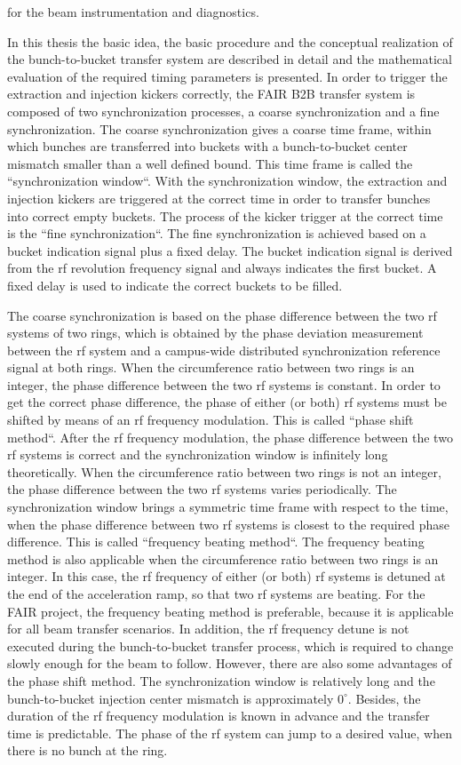for the beam instrumentation and diagnostics. 

In this thesis the basic idea, the basic procedure and the conceptual realization of the bunch-to-bucket transfer system are described in detail and the mathematical evaluation of the required timing parameters is presented. In order to trigger the extraction and injection kickers correctly, the FAIR B2B transfer system is composed of two synchronization processes, a coarse synchronization and a fine synchronization. The coarse synchronization gives a coarse time frame, within which bunches are transferred into buckets with a bunch-to-bucket center mismatch smaller than a well defined bound. This time frame is called the ``synchronization window``. With the synchronization window, the extraction and injection kickers are triggered at the correct time in order to transfer bunches into correct empty buckets. The process of the kicker trigger at the correct time is the ``fine synchronization``. The fine synchronization is achieved based on a bucket indication signal plus a fixed delay. The bucket indication signal is derived from the rf revolution frequency signal and always indicates the first bucket. A fixed delay is used to indicate the correct buckets to be filled.

The coarse synchronization is based on the phase difference between the two rf systems of two rings, which is obtained by the phase deviation measurement between the rf system and a campus-wide distributed synchronization reference signal at both rings. When the circumference ratio between two rings is an integer, the phase difference between the two rf systems is constant. In order to get the correct phase difference, the phase of either (or both) rf systems must be shifted by means of an rf frequency modulation. This is called ``phase shift method``. After the rf frequency modulation, the phase difference between the two rf systems is correct and the synchronization window is infinitely long theoretically. When the circumference ratio between two rings is not an integer, the phase difference between the two rf systems varies periodically. The synchronization window brings a symmetric
time frame with respect to the time, when the phase difference between two rf systems is closest to the required phase difference. This is called ``frequency beating method``. The frequency beating method is also applicable when the circumference ratio between two rings is an integer. In this case, the rf frequency of either (or both) rf systems is detuned at the end of the acceleration ramp, so that two rf systems are beating. For the FAIR project, the frequency beating method is preferable, because it is applicable for all beam transfer scenarios. In addition, the rf frequency detune is not executed during the bunch-to-bucket transfer process, which is required to change slowly enough for the beam to follow. However, there are also some advantages of the phase shift method. The synchronization window is relatively long and the bunch-to-bucket injection center mismatch is approximately $0^\circ$. Besides, the duration of the rf frequency modulation is known in advance and the transfer time is predictable. The phase of the rf system can jump to a desired value, when there is no bunch at the ring.  

